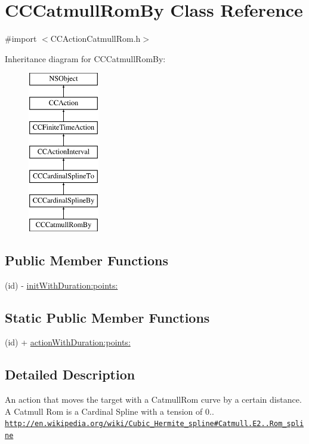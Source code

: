 \hypertarget{interface_c_c_catmull_rom_by}{\section{C\-C\-Catmull\-Rom\-By Class Reference}
\label{interface_c_c_catmull_rom_by}
}


{\ttfamily \#import $<$C\-C\-Action\-Catmull\-Rom.\-h$>$}

Inheritance diagram for C\-C\-Catmull\-Rom\-By\-:\begin{figure}[H]
\begin{center}
\leavevmode
\includegraphics[height=7.000000cm]{interface_c_c_catmull_rom_by}
\end{center}
\end{figure}
\subsection*{Public Member Functions}
\begin{DoxyCompactItemize}
\item 
(id) -\/ \hyperlink{interface_c_c_catmull_rom_by_afcf10d30ea73b472eed3770ac53a813a}{init\-With\-Duration\-:points\-:}
\end{DoxyCompactItemize}
\subsection*{Static Public Member Functions}
\begin{DoxyCompactItemize}
\item 
(id) + \hyperlink{interface_c_c_catmull_rom_by_ad1173fd5720624fcac84d0f1bba2983d}{action\-With\-Duration\-:points\-:}
\end{DoxyCompactItemize}


\subsection{Detailed Description}
An action that moves the target with a Catmull\-Rom curve by a certain distance. A Catmull Rom is a Cardinal Spline with a tension of 0.. \href{http://en.wikipedia.org/wiki/Cubic_Hermite_spline#Catmull.E2.80.93Rom_spline}{\tt http\-://en.\-wikipedia.\-org/wiki/\-Cubic\-\_\-\-Hermite\-\_\-spline\#\-Catmull.\-E2..\-Rom\-\_\-spline} 

